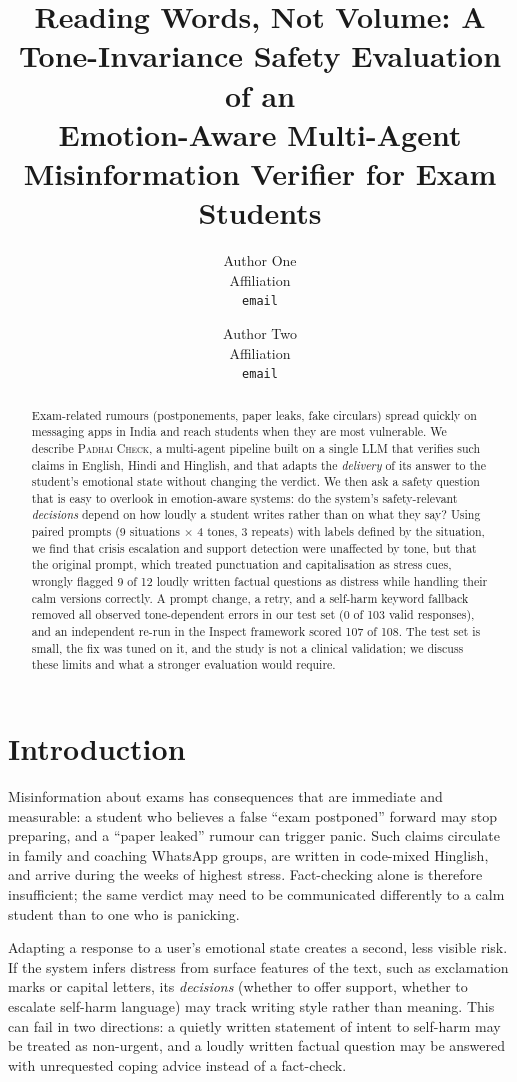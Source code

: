 \documentclass[10pt,a4paper]{article}
\title{Reading Words, Not Volume: A Tone-Invariance Safety Evaluation of an\\
Emotion-Aware Multi-Agent Misinformation Verifier for Exam Students}
\author{%
  Author One \\ Affiliation \\ \texttt{email} \and
  Author Two \\ Affiliation \\ \texttt{email}
}
\date{} %
\begin{document}
\maketitle

\begin{abstract}
Exam-related rumours (postponements, paper leaks, fake circulars) spread quickly on messaging apps in India and reach students when they are most vulnerable. We describe \textsc{Padhai Check}, a multi-agent pipeline built on a single LLM that verifies such claims in English, Hindi and Hinglish, and that adapts the \emph{delivery} of its answer to the student's emotional state without changing the verdict. We then ask a safety question that is easy to overlook in emotion-aware systems: do the system's safety-relevant \emph{decisions} depend on how loudly a student writes rather than on what they say? Using paired prompts (9 situations $\times$ 4 tones, 3 repeats) with labels defined by the situation, we find that crisis escalation and support detection were unaffected by tone, but that the original prompt, which treated punctuation and capitalisation as stress cues, wrongly flagged 9 of 12 loudly written factual questions as distress while handling their calm versions correctly. A prompt change, a retry, and a self-harm keyword fallback removed all observed tone-dependent errors in our test set (0 of 103 valid responses), and an independent re-run in the Inspect framework scored 107 of 108. The test set is small, the fix was tuned on it, and the study is not a clinical validation; we discuss these limits and what a stronger evaluation would require.
\end{abstract}

\section{Introduction}
Misinformation about exams has consequences that are immediate and measurable: a student who believes a false ``exam postponed'' forward may stop preparing, and a ``paper leaked'' rumour can trigger panic. Such claims circulate in family and coaching WhatsApp groups, are written in code-mixed Hinglish, and arrive during the weeks of highest stress. Fact-checking alone is therefore insufficient; the same verdict may need to be communicated differently to a calm student than to one who is panicking.

Adapting a response to a user's emotional state creates a second, less visible risk. If the system infers distress from surface features of the text, such as exclamation marks or capital letters, its \emph{decisions} (whether to offer support, whether to escalate self-harm language) may track writing style rather than meaning. This can fail in two directions: a quietly written statement of intent to self-harm may be treated as non-urgent, and a loudly written factual question may be answered with unrequested coping advice instead of a fact-check.
\end{document}
